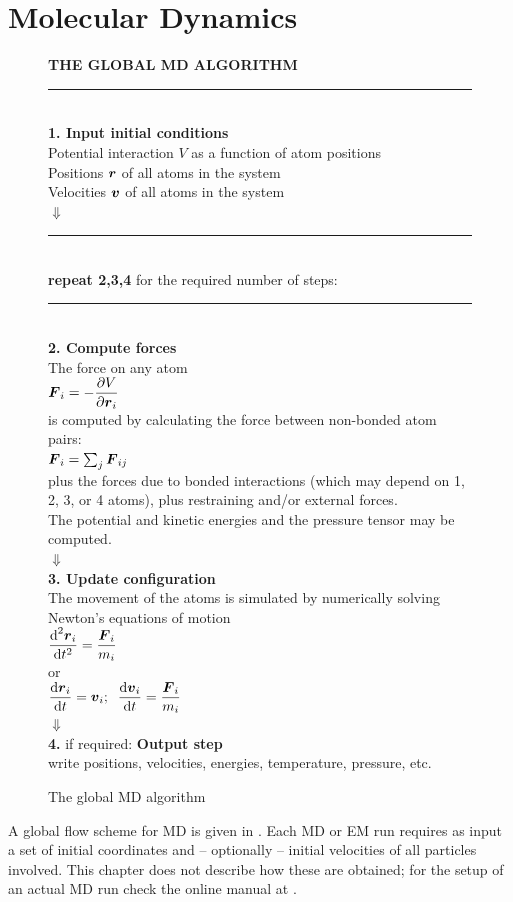 \section{Molecular Dynamics}
\label{sec:MD}
\begin{figure}
\begin{center}
\addtolength{\fboxsep}{0.5cm}
\begin{shadowenv}[12cm]
{\large \bf THE GLOBAL MD ALGORITHM}
\rule{\textwidth}{2pt} \\
{\bf 1. Input initial conditions}\\[2ex]
Potential interaction $V$ as a function of atom positions\\
Positions $\mbox{\boldmath ${r}$}$ of all atoms in the system\\
Velocities $\mbox{\boldmath ${v}$}$ of all atoms in the system \\
$\Downarrow$\\
\rule{\textwidth}{1pt}\\
{\bf repeat 2,3,4} for the required number of steps:\\
\rule{\textwidth}{1pt}\\
{\bf 2. Compute forces} \\[1ex]
The force on any atom  \\[1ex]
$\mbox{\boldmath ${F}$}_i = - \displaystyle\frac{\partial V}{\partial \mbox{\boldmath ${r}$}_i}$ \\[1ex]
is computed by calculating the force between non-bonded atom pairs: \\
$\mbox{\boldmath ${F}$}_i = \sum_j \mbox{\boldmath ${F}$}_{ij}$ \\
plus the forces due to bonded interactions (which may depend on 1, 2,
3, or 4 atoms), plus restraining and/or external forces. \\
The potential and kinetic energies and the pressure tensor may be computed. \\
$\Downarrow$\\
{\bf 3. Update configuration} \\[1ex]
The movement of the atoms is simulated by numerically solving Newton's
equations of motion \\[1ex]
$\displaystyle
\frac {\mbox{d}^2\mbox{\boldmath ${r}$}_i}{\mbox{d} t^2} = \frac{\mbox{\boldmath ${F}$}_i}{m_i} $ \\
or \\
$\displaystyle
\frac{\mbox{d}\mbox{\boldmath ${r}$}_i}{\mbox{d} t} = \mbox{\boldmath ${v}$}_i ; \;\;
\frac{\mbox{d}\mbox{\boldmath ${v}$}_i}{\mbox{d} t} = \frac{\mbox{\boldmath ${F}$}_i}{m_i} $ \\[1ex]
$\Downarrow$ \\
{\bf 4.} if required: {\bf Output step} \\
write positions, velocities, energies, temperature, pressure, etc. \\
\end{shadowenv}
\caption{The global MD algorithm}
\label{fig:global}
\end{center}
\end{figure}
A global flow scheme for MD is given in . Each
MD or  EM run requires as input a set of initial coordinates and --
optionally -- initial velocities of all particles involved. This
chapter does not describe how these are obtained; for the setup of an
actual MD run check the online manual at {\wwwpage}.

